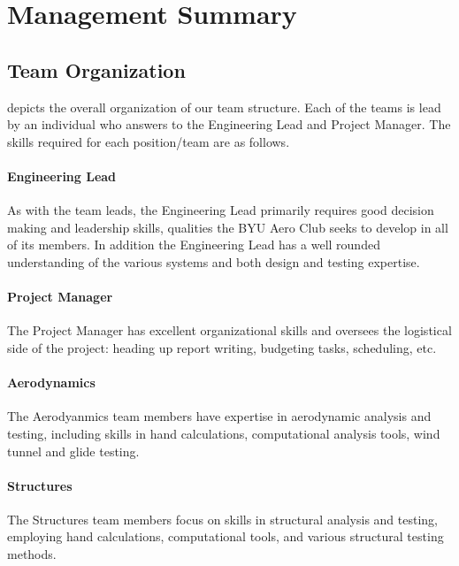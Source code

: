 \documentclass[report]{byu-aero}
\begin{document}
\section{Management Summary} %
\label{sec:ManagementSummary}


\subsection{Team Organization}
\label{ssec:TeamOrganization}



 depicts the overall organization of our team structure.  Each of the teams is lead by an individual who answers to the Engineering Lead and Project Manager.  The skills required for each position/team are as follows.

\paragraph{Engineering Lead} As with the team leads, the Engineering Lead primarily requires good decision making and leadership skills, qualities the BYU Aero Club seeks to develop in all of its members.  In addition the Engineering Lead has a well rounded understanding of the various systems and both design and testing expertise.
\paragraph{Project Manager} The Project Manager has excellent organizational skills  and oversees the logistical side of the project: heading up report writing, budgeting tasks, scheduling, etc.
\paragraph{Aerodynamics} The Aerodyanmics team members have expertise in aerodynamic analysis and testing, including skills in hand calculations, computational analysis tools, wind tunnel and glide testing.
\paragraph{Structures} The Structures team members focus on skills in structural analysis and testing, employing hand calculations, computational tools, and various structural testing methods.
\end{document}
